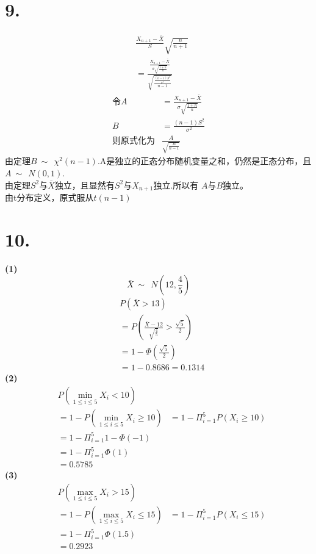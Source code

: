 \documentclass[a4paper,twocolumn]{ctexart}
\begin{document}
\section*{9.}
\begin{align*}
&\frac{X_{n+1}-\bar{X}}{S}\sqrt{\frac{n}{n+1}}\\
&=\frac{\frac{X_{n+1}-\bar{X}}{\sigma\sqrt{\frac{1+n}{n}}}}{\sqrt{\frac{\frac{(n-1)S^2}{\sigma^2}}{n-1}}}
\end{align*}
\begin{align*}
\text{令}A&=\frac{X_{n+1}-\bar{X}}{\sigma\sqrt{\frac{1+n}{n}}}\\
B&=\frac{(n-1)S^2}{\sigma^2}\\
\text{则原式化为}&\frac{A}{\sqrt{\frac{B}{n-1}}}
\end{align*}
由定理$B~\sim~~\chi^2(n-1)$.A是独立的正态分布随机变量之和，仍然是正态分布，且$A~\sim~~N(0,1)$.\\
由定理$S^2$与$\bar{X}$独立，且显然有$S^2$与$X_{n+1}$独立.所以有
$A$与$B$独立。\\
由t分布定义，原式服从$t(n-1)$
\section*{10.}
\noindent\textbf{(1)}\\
\[
\bar{X}~\sim~~N(12,\frac{4}{5})
\]
\begin{align*}
&P(\bar{X}>13)\\
&=P(\frac{\bar{X}-12}{\sqrt{\frac{4}{5}}}>\frac{\sqrt{5}}{2})\\
&=1-\Phi(\frac{\sqrt{5}}{2})\\
&=1-0.8686=0.1314
\end{align*}
\noindent\textbf{(2)}\\
\begin{align*}
&P(\underset{1\le i\le 5}{\min}X_i<10)\\
&=1-P(\underset{1\le i\le 5}{\min}X_i\ge10)
&=1-\Pi_{i=1}^5P(X_i\ge 10)\\
&=1-\Pi_{i=1}^5 1-\Phi(-1)\\
&=1-\Pi_{i=1}^5 \Phi(1)\\
&=0.5785
\end{align*}
\noindent\textbf{(3)}\\
\begin{align*}
&P(\underset{1\le i\le 5}{\max}X_i>15)\\
&=1-P(\underset{1\le i\le 5}{\max}X_i\le 15)
&=1-\Pi_{i=1}^5P(X_i\le 15)\\
&=1-\Pi_{i=1}^5\Phi(1.5)\\
&=0.2923
\end{align*}
\end{document}
